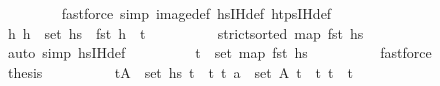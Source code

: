 \begin{isabellebody}
\ \ \ \ \ \ \ \ \isamarkupfalse%
{\isacharparenleft}{\kern0pt}fastforce\ simp{\isacharcolon}{\kern0pt}\ image{\isacharunderscore}{\kern0pt}def\ hs{\isacharprime}{\kern0pt}{\isacharunderscore}{\kern0pt}IH{\isacharunderscore}{\kern0pt}def\ htps{\isacharunderscore}{\kern0pt}IH{\isacharunderscore}{\kern0pt}def{\isacharparenright}{\kern0pt}{\isacharplus}{\kern0pt}\isanewline
\ \ \ \ \ \ \isamarkupfalse%
\ {\isachardoublequoteopen}{\isasymAnd}h{}{\isacharprime}{\kern0pt}{\isachardot}{\kern0pt}\ h{}{\isacharprime}{\kern0pt}\ {\isasymin}\ set\ hs{}\ {\isasymLongrightarrow}\ fst\ h{}{\isacharprime}{\kern0pt}\ {\isacharless}{\kern0pt}\ t\isanewline
\ \ \ \ \ \ \ \ \isamarkupfalse%
\ {\isacartoucheopen}strict{\isacharunderscore}{\kern0pt}sorted\ {\isacharparenleft}{\kern0pt}map\ fst\ hs{\isacharparenright}{\kern0pt}{\isacartoucheclose}\isanewline
\ \ \ \ \ \ \ \ \isamarkupfalse%
\ {\isacharparenleft}{\kern0pt}auto\ simp{\isacharcolon}{\kern0pt}\ hs{\isacharunderscore}{\kern0pt}IH{\isacharunderscore}{\kern0pt}def{\isacharparenright}{\kern0pt}\isanewline
\ \ \ \ \ \ \isamarkupfalse%
\ \isamarkupfalse%
\ {\isachardoublequoteopen}t{\isacharprime}{\kern0pt}{\isacharprime}{\kern0pt}{\isacharprime}{\kern0pt}\ {\isasymnotin}\ set\ {\isacharparenleft}{\kern0pt}map\ fst\ hs{}{\isacharparenright}{\kern0pt}{\isachardoublequoteclose}\isanewline
\ \ \ \ \ \ \ \ \isamarkupfalse%
\ fastforce\isanewline
\ \ \ \ \ \ \isamarkupfalse%
\ {\isacharquery}{\kern0pt}thesis\isanewline
\ \ \ \ \ \ \ \ \isamarkupfalse%
\ {\isacartoucheopen}{\isacharparenleft}{\kern0pt}t{\isacharprime}{\kern0pt}{\isacharprime}{\kern0pt}{\isacharprime}{\kern0pt}{\isacharcomma}{\kern0pt}A{\isacharprime}{\kern0pt}{\isacharprime}{\kern0pt}{\isacharprime}{\kern0pt}{\isacharparenright}{\kern0pt}\ {\isasymin}\ set\ hs{\isacartoucheclose}\ {\isacartoucheopen}t{\isacharprime}{\kern0pt}{\isacharprime}{\kern0pt}{\isacharprime}{\kern0pt}\ {\isasymin}\ {\isacharbraceleft}{\kern0pt}t\ t\ {\isacartoucheopen}a\ {\isasymin}\ set\ A{\isacharprime}{\kern0pt}{\isacharprime}{\kern0pt}{\isacharprime}{\kern0pt}{\isacartoucheclose}\ {\isacartoucheopen}t{\isacharprime}{\kern0pt}\ {\isacharless}{\kern0pt}\ t\ {\isacartoucheopen}t\ {\isacharless}{\kern0pt}\ t{\isacharprime}{\kern0pt}{\isacharprime}{\kern0pt}{\isacharprime}{\kern0pt}{\isacartoucheclose}\isanewline

\end{isabellebody}
